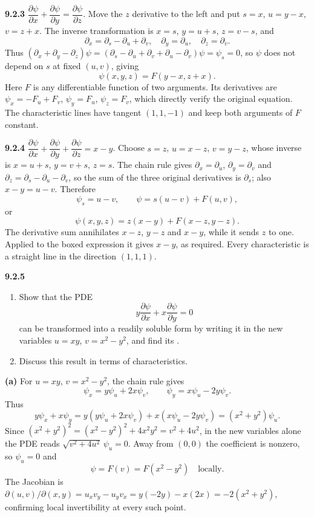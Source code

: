 \par\bigskip
\noindent\textbf{9.2.3}\quad
$\dfrac{\partial\psi}{\partial x}+\dfrac{\partial\psi}{\partial y}
=\dfrac{\partial\psi}{\partial z}$.
\solution
Move the $z$ derivative to the left and put
$s=x$, $u=y-x$, $v=z+x$.  The inverse transformation is
$x=s$, $y=u+s$, $z=v-s$, and
\[
\partial_x=\partial_s-\partial_u+\partial_v,
\quad\partial_y=\partial_u,
\quad\partial_z=\partial_v.
\]
Thus
$(\partial_x+\partial_y-\partial_z)\psi
=(\partial_s-\partial_u+\partial_v+\partial_u-\partial_v)\psi
=\psi_s=0$, so $\psi$ does not depend on $s$ at fixed $(u,v)$, giving
\[
\boxed{\psi(x,y,z)=F(y-x,z+x)}.
\]
Here $F$ is any differentiable function of two arguments.  Its derivatives
are $\psi_x=-F_u+F_v$, $\psi_y=F_u$, $\psi_z=F_v$, which directly
verify the original equation.  The characteristic lines have tangent
$(1,1,-1)$ and keep both arguments of $F$ constant.


\par\bigskip
\noindent\textbf{9.2.4}\quad
$\dfrac{\partial\psi}{\partial x}+\dfrac{\partial\psi}{\partial y}
+\dfrac{\partial\psi}{\partial z}=x-y$.
\solution
Choose $s=z$, $u=x-z$, $v=y-z$, whose inverse is
$x=u+s$, $y=v+s$, $z=s$.  The chain rule gives
$\partial_x=\partial_u$, $\partial_y=\partial_v$ and
$\partial_z=\partial_s-\partial_u-\partial_v$, so the sum of the three
original derivatives is $\partial_s$; also $x-y=u-v$.  Therefore
\[
\psi_s=u-v,\qquad \psi=s(u-v)+F(u,v),
\]
or
\[
\boxed{\psi(x,y,z)=z(x-y)+F(x-z,y-z)}.
\]
The derivative sum annihilates $x-z$, $y-z$ and $x-y$, while it sends
$z$ to one.  Applied to the boxed expression it gives $x-y$, as required.
Every characteristic is a straight line in the direction $(1,1,1)$.


\par\bigskip
\noindent\textbf{9.2.5}\quad
\begin{enumerate}
\item[(a)] Show that the PDE
  \[
  y\frac{\partial\psi}{\partial x}+x\frac{\partial\psi}{\partial y}=0
  \]
  can be transformed into a readily soluble form by writing it in the new
  variables $u=xy$, $v=x^{2}-y^{2}$, and find its
  .
\item[(b)] Discuss this result in terms of characteristics.
\end{enumerate}
\solution
\textbf{(a)} For $u=xy$, $v=x^2-y^2$, the chain rule gives
\[
\psi_x=y\psi_u+2x\psi_v,\qquad
\psi_y=x\psi_u-2y\psi_v.
\]
Thus
\[
y\psi_x+x\psi_y
=y(y\psi_u+2x\psi_v)+x(x\psi_u-2y\psi_v)
=(x^2+y^2)\psi_u.
\]
Since $(x^2+y^2)^2=(x^2-y^2)^2+4x^2y^2=v^2+4u^2$, in the new variables
alone the PDE reads $\sqrt{v^2+4u^2}\,\psi_u=0$.
Away from $(0,0)$ the coefficient is nonzero, so $\psi_u=0$ and
\[
\boxed{\psi=F(v)=F(x^2-y^2)\quad\text{locally}}.
\]
The Jacobian is
$\partial(u,v)/\partial(x,y)=u_xv_y-u_yv_x=y(-2y)-x(2x)
=-2(x^2+y^2)$, confirming local
invertibility at every such point.

